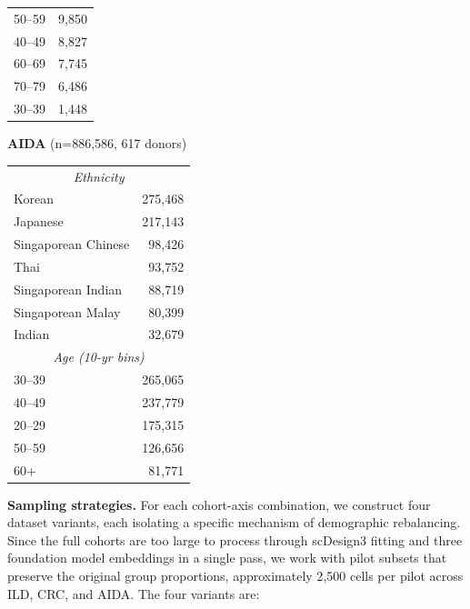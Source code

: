 \documentclass[sigconf]{acmart}
\begin{document}
\begin{table}[h]
\begin{minipage}[t]{0.33\textwidth}
\begin{tabular}{@{}lr@{}}
50--59 & 9{,}850 \\
40--49 & 8{,}827 \\
60--69 & 7{,}745 \\
70--79 & 6{,}486 \\
30--39 & 1{,}448 \\
\bottomrule
\end{tabular}
\end{minipage}%
\hfill
\begin{minipage}[t]{0.33\textwidth}
\centering
\textbf{AIDA} (n=886{,}586, 617 donors)\\[2pt]
\begin{tabular}{@{}lr@{}}
\toprule
\multicolumn{2}{c}{\textit{Ethnicity}} \\
Korean              & 275{,}468 \\
Japanese            & 217{,}143 \\
Singaporean Chinese & 98{,}426 \\
Thai                & 93{,}752 \\
Singaporean Indian  & 88{,}719 \\
Singaporean Malay   & 80{,}399 \\
Indian              & 32{,}679 \\
\midrule
\multicolumn{2}{c}{\textit{Age (10-yr bins)}} \\
30--39 & 265{,}065 \\
40--49 & 237{,}779 \\
20--29 & 175{,}315 \\
50--59 & 126{,}656 \\
60+    & 81{,}771 \\
\bottomrule
\end{tabular}
\end{minipage}
\end{table}

\textbf{Sampling strategies.} For each cohort-axis combination, we construct 
four dataset variants, each isolating a specific mechanism of demographic 
rebalancing. Since the full cohorts are too large to process through scDesign3 
fitting and three foundation model embeddings in a single pass, we work with 
pilot subsets that preserve the original group proportions, approximately 
2{,}500 cells per pilot across ILD, CRC, and AIDA. The four variants are:
\end{document}
